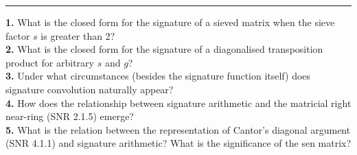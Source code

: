 \documentclass{article}
\begin{document}
\begin{center}
\rule{4cm}{0.4pt}
\end{center}

\noindent \textbf{1.} What is the closed form for the signature of a sieved matrix when the sieve factor $s$ is greater than 2?\\

\noindent \textbf{2.} What is the closed form for the signature of a diagonalised transposition product for arbitrary $s$ and $g$?\\

\noindent \textbf{3.} Under what circumstances (besides the signature function itself) does signature convolution naturally appear?\\

\noindent \textbf{4.} How does the relationship between signature arithmetic and the matricial right near-ring (SNR 2.1.5) emerge?\\

\noindent \textbf{5.} What is the relation between the representation of Cantor's diagonal argument (SNR 4.1.1) and signature arithmetic? What is the significance of the sen matrix?\\
\end{document}
